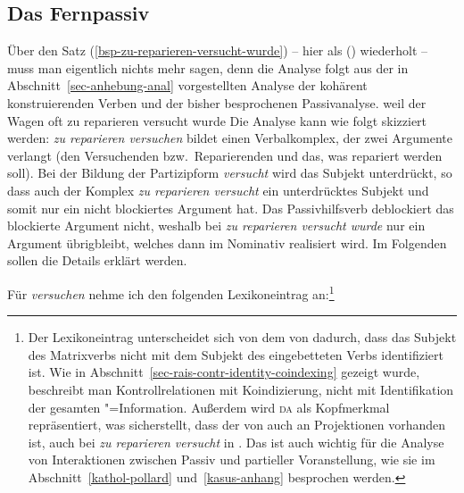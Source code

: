 {\subsection{Das Fernpassiv}
\label{sec-remote-passive-hpsg}


Über den Satz (\ref{bsp-zu-reparieren-versucht-wurde}) -- hier als () wiederholt --
muss man eigentlich nichts mehr sagen, denn die Analyse folgt aus der in Abschnitt~\ref{sec-anhebung-anal}
vorgestellten Analyse der kohärent konstruierenden Verben und der bisher besprochenen
Passivanalyse.
\ea
\label{bsp-zu-reparieren-versucht-wurde-zwei}
weil    der Wagen oft zu reparieren versucht wurde
\z
Die Analyse kann wie folgt skizziert werden: \emph{zu reparieren versuchen} bildet einen
Verbalkomplex, der zwei Argumente verlangt (den Versuchenden bzw.\ Reparierenden und das, was
repariert werden soll). Bei der Bildung der Partizipform \emph{versucht} wird das Subjekt
unterdrückt, so dass auch der Komplex \emph{zu reparieren versucht} ein unterdrücktes Subjekt und
somit nur ein nicht blockiertes Argument hat. Das Passivhilfsverb deblockiert das blockierte
Argument nicht, weshalb bei \emph{zu reparieren versucht wurde} nur ein Argument übrigbleibt,
welches dann im Nominativ realisiert wird. Im Folgenden sollen die Details erklärt werden.

Für \emph{versuchen} nehme ich den folgenden Lexikoneintrag an:\footnote{
        Der Lexikoneintrag unterscheidet sich von dem von
        \citet[]{HM94a} dadurch, dass das Subjekt des Matrixverbs
        nicht mit dem Subjekt des eingebetteten Verbs identifiziert ist.
        Wie in Abschnitt~\ref{sec-rais-contr-identity-coindexing} gezeigt
        wurde, beschreibt man Kontrollrelationen mit Koindizierung, nicht mit Identifikation
        der gesamten "=Information.
        Außerdem wird \textsc{da} als Kopfmerkmal repräsentiert, was
        sicherstellt, dass der \daw von  auch an Projektionen vorhanden ist,
        \dash auch bei \emph{zu reparieren versucht} in .
        Das ist auch wichtig für die Analyse von Interaktionen zwischen Passiv
        und partieller Voranstellung, wie sie im Abschnitt~\ref{kathol-pollard}
        und~\ref{kasus-anhang} besprochen werden.%
}

}
